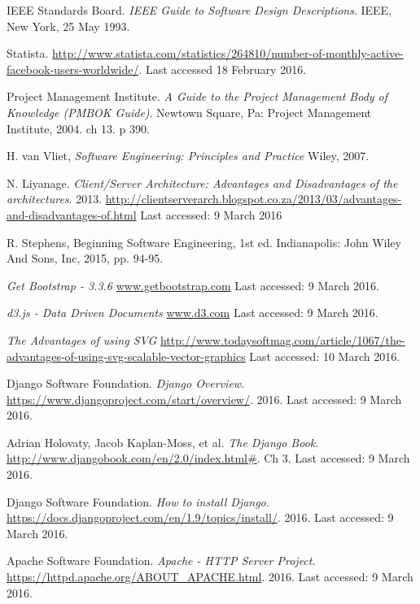 \documentclass[12pt,onecolumn]{article}
\begin{document}
	
	\begin{thebibliography}{1}
		 IEEE Standards Board. \emph{IEEE Guide to Software Design Descriptions}. IEEE, New York, 25 May 1993.
		
		 Statista. \url {http://www.statista.com/statistics/264810/number-of-monthly-active-facebook-users-worldwide/}. Last accessed 18 February 2016. 
		
		 Project Management Institute. \emph{A Guide to the Project Management Body of Knowledge (PMBOK Guide)}. Newtown Square, Pa: Project Management Institute, 2004. ch 13. p 390.
		
		 H. van Vliet, \emph{Software Engineering: Principles and Practice} Wiley, 2007.
		
		 N. Liyanage. \emph{Client/Server Architecture: Advantages and Disadvantages of the architectures}. 2013. \url{http://clientserverarch.blogspot.co.za/2013/03/advantages-and-disadvantages-of.html} Last accessed: 9 March 2016
		
		 R. Stephens, Beginning Software Engineering, 1st ed. Indianapolis: John Wiley And Sons, Inc, 2015, pp. 94-95.
		
		  \emph{Get Bootstrap - 3.3.6} \url{www.getbootstrap.com} Last accessed: 9 March 2016.
		
		  \emph{d3.js - Data Driven Documents} \url{www.d3.com} Last accessed: 9 March 2016.
		
		  \emph{The Advantages of using SVG} \url{http://www.todaysoftmag.com/article/1067/the-advantages-of-using-svg-scalable-vector-graphics} Last accessed: 10 March 2016.
		
		 Django Software Foundation. \emph{Django Overview}. \url{https://www.djangoproject.com/start/overview/}. 2016. Last accessed: 9 March 2016. 
		
		 Adrian Holovaty, Jacob Kaplan-Moss, et al. \emph{The Django Book}. \url{http://www.djangobook.com/en/2.0/index.html#}. Ch 3. Last accessed: 9 March 2016.
		
		 Django Software Foundation. \emph{How to install Django}. \url{https://docs.djangoproject.com/en/1.9/topics/install/}. 2016. Last accessed: 9 March 2016.	
		
		 Apache Software Foundation. \emph{Apache - HTTP Server Project}. \url{https://httpd.apache.org/ABOUT_APACHE.html}. 2016. Last accessed: 9 March 2016.	
		

\end{thebibliography}
\end{document}
